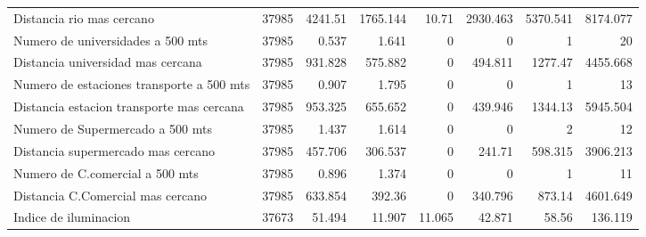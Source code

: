 \begin{table}[!htbp]
{\begin{tabular}{lrrrrrrr}
Distancia rio mas cercano & 37985 & 4241.51 & 1765.144 & 10.71 & 2930.463 & 5370.541 & 8174.077 \\ 
Numero de universidades a 500 mts & 37985 & 0.537 & 1.641 & 0 & 0 & 1 & 20 \\ 
Distancia universidad mas cercana & 37985 & 931.828 & 575.882 & 0 & 494.811 & 1277.47 & 4455.668 \\ 
Numero de estaciones transporte a 500 mts & 37985 & 0.907 & 1.795 & 0 & 0 & 1 & 13 \\ 
Distancia estacion transporte mas cercana & 37985 & 953.325 & 655.652 & 0 & 439.946 & 1344.13 & 5945.504 \\ 
Numero de Supermercado a 500 mts & 37985 & 1.437 & 1.614 & 0 & 0 & 2 & 12 \\ 
Distancia supermercado mas cercano & 37985 & 457.706 & 306.537 & 0 & 241.71 & 598.315 & 3906.213 \\ 
Numero de C.comercial a 500 mts & 37985 & 0.896 & 1.374 & 0 & 0 & 1 & 11 \\ 
Distancia C.Comercial mas cercano & 37985 & 633.854 & 392.36 & 0 & 340.796 & 873.14 & 4601.649 \\ 
Indice de iluminacion & 37673 & 51.494 & 11.907 & 11.065 & 42.871 & 58.56 & 136.119\\ 
\hline
\hline
\end{tabular}
}
\end{table}

